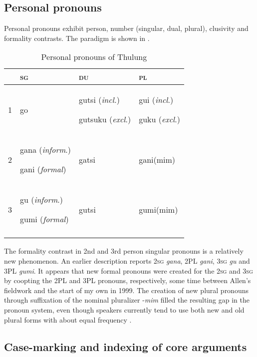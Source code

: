 \documentclass[output=paper]{langscibook}
\begin{document}
\subsection{Personal pronouns}
\label{sec:Lahaussois:2.1}

Personal pronouns exhibit person, number (singular, dual, plural), clusivity and formality contrasts. The paradigm is shown in .


\begin{table}
\begin{tabularx}{0.73\textwidth}{lp{2.5cm}p{2.5cm}p{2cm}} 
\lsptoprule
& \textsc{sg} & \textsc{du} & \textsc{pl}\\
\midrule
1 & go & gutsi (\textit{incl.})

gutsuku (\textit{excl}.) & gui (\textit{incl}.)

guku (\textit{excl}.)\\
2 & gana (\textit{inform}.)

gani (\textit{formal}) & gatsi & gani(mim)\\
3 & gu (\textit{inform}.)

gumi (\textit{formal}) & gutsi & gumi(mim)\\
\lspbottomrule
\end{tabularx}
\caption{Personal pronouns of Thulung}
\label{tab:Lahaussois:1}
\end{table}

The formality contrast in 2nd and 3rd person singular pronouns is a relatively new phenomenon.  An earlier description \citep{Allen1975} reports 2\textsc{sg} \textit{gana}, 2\textsc{PL} \textit{gani}, 3\textsc{sg} \textit{gu} and 3\textsc{PL} \textit{gumi}.  It appears that new formal pronouns were created for the 2\textsc{sg} and 3\textsc{sg} by coopting the 2\textsc{PL} and 3\textsc{PL} pronouns, respectively, some time between Allen's fieldwork and the start of my own in 1999.  The creation of new plural pronouns through suffixation of the nominal pluralizer -\textit{mim} filled the resulting gap in the pronoun system, even though speakers currently tend to use both new and old plural forms with about equal frequency \citep{Lahaussois2003}.

\subsection{Case-marking and indexing of core arguments}
\label{sec:Lahaussois:2.2}
\end{document}
